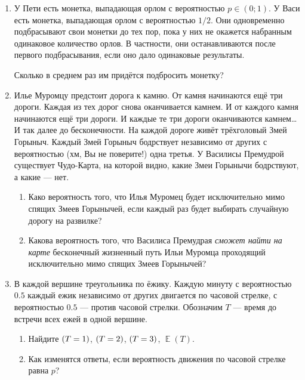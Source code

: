 \documentclass[12pt]{article}
\let\P\relax
\DeclareMathOperator{\P}{\mathbb{P}}
\DeclareMathOperator{\E}{\mathbb{E}}
\newcommand{\addtag}[1]{}
\begin{document}
\begin{enumerate}[resume]
    \item  У Пети есть монетка, выпадающая орлом с вероятностью $ p\in (0;1) $.
    У Васи есть монетка, выпадающая орлом с вероятностью $1/2$.
    Они одновременно подбрасывают свои монетки до тех пор,
    пока у них не окажется набранным одинаковое количество орлов.
    В частности, они останавливаются после первого подбрасывания,
    если оно дало одинаковые результаты. 
    
    Сколько в среднем раз им придётся подбросить монетку?
    \item Илье Муромцу\addtag{герои!Илья Муромец} предстоит дорога к камню. От камня начинаются ещё три дороги.
    Каждая из тех дорог снова оканчивается камнем. И от каждого камня начинаются ещё три дороги.
    И каждые те три дороги оканчиваются камнем\ldots И так далее до бесконечности.
    На каждой дороге живёт трёхголовый Змей Горыныч\addtag{герои!Змей Горыныч}.
    Каждый Змей Горыныч бодрствует независимо от других с вероятностью (хм, Вы не поверите!) одна третья.
    У Василисы Премудрой\addtag{герои!Василиса Премудрая} существует Чудо-Карта, на которой видно,
    какие Змеи Горынычи бодрствуют\addtag{герои!Змей Горыныч}, а какие — нет.
    
    \begin{enumerate}
    \item Како вероятность того, что Илья Муромец будет исключительно мимо спящих Змеев Горынычей, если каждый раз будет выбирать случайную дорогу на развилке?
    \item Какова вероятность того,
    что Василиса Премудрая\addtag{герои!Василиса Премудрая}  \emph{сможет найти на карте}
    бесконечный жизненный путь Ильи Муромца проходящий исключительно мимо спящих Змеев Горынычей?
    \end{enumerate}
    
    \item В каждой вершине треугольника по ёжику. Каждую минуту с вероятностью $0.5$ каждый ежик
    независимо от других двигается по часовой стрелке, с вероятностью
    $0.5$ — против часовой стрелки.
    Обозначим $T$ — время до встречи всех ежей в одной вершине.
    
    \begin{enumerate}
      \item Найдите $\P(T=1)$, $\P(T=2)$, $\P(T=3)$, $\E(T)$.
      \item Как изменятся ответы, если вероятность движения по часовой стрелке равна $p$?
    \end{enumerate}


\end{enumerate}
\end{document}
